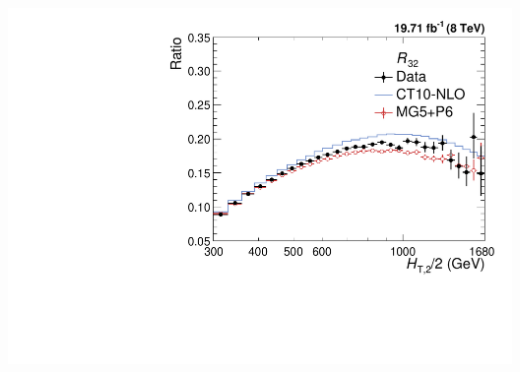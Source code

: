 \documentclass{beamer}
\begin{document}
\begin{frame}
\begin{minipage}[tbp]{0.25\textwidth}
\includegraphics[scale = 0.25]{Plots_HT_2_150/Ratio_32_all_HT_2_150.pdf}\\
\end{minipage}\\
\vspace{-7mm}
\end{frame}
\end{document}

